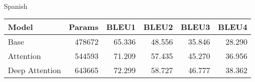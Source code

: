  \\ 
Spanish \\ 
\begin{tabular}{lrrrrr}
\toprule
          Model &  Params &   BLEU1 &   BLEU2 &   BLEU3 &   BLEU4 \\
\midrule
           Base &  478672 &  65.336 &  48.556 &  35.846 &  28.290 \\
      Attention &  544593 &  71.209 &  57.435 &  45.270 &  36.956 \\
 Deep Attention &  643665 &  72.299 &  58.727 &  46.777 &  38.362 \\
\bottomrule
\end{tabular}
 \\ 
